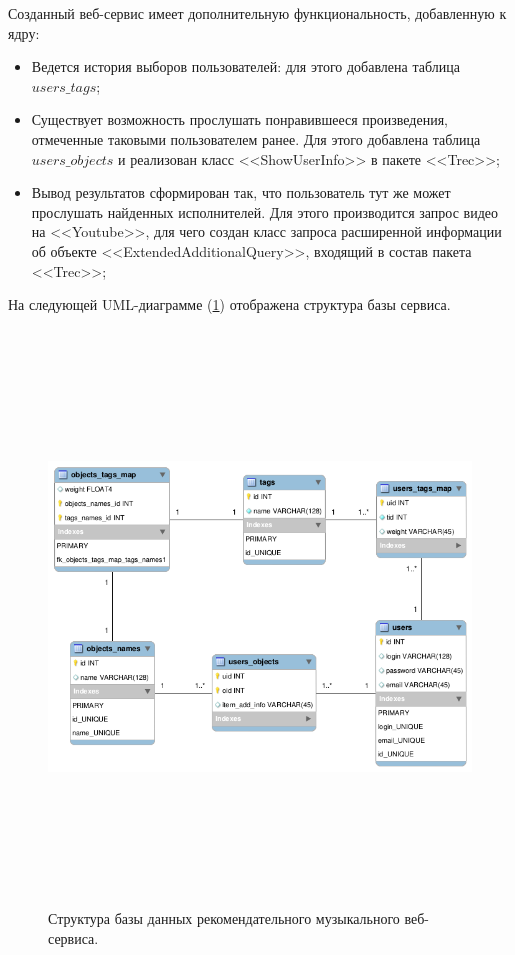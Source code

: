 Созданный веб-сервис имеет дополнительную функциональность, добавленную к ядру:
\begin{itemize}
\item Ведется история выборов пользователей: для этого добавлена таблица $users\_tags$;
\item Существует возможность прослушать понравившееся произведения, отмеченные
	таковыми пользователем ранее. Для этого
добавлена таблица $users\_objects$ и реализован класс <<ShowUserInfo>> в пакете
		<<Trec>>;
\item Вывод результатов сформирован так, что пользователь тут же может
	прослушать найденных исполнителей.
Для этого производится запрос видео на <<Youtube>>, для чего создан класс запроса
		расширенной информации об объекте
<<ExtendedAdditionalQuery>>, входящий в состав пакета <<Trec>>;
\end{itemize}

На следующей UML-диаграмме (\ref{pic:db-lf}) отображена структура базы сервиса.

\begin{figure}
	\label{pic:db-lf}
\caption{Структура базы данных рекомендательного музыкального веб-сервиса.}
\begin{center}
  \includegraphics[width=7in,height=6in]{pics/db-scheme-lastfm.png}
\end{center}
\end{figure}

